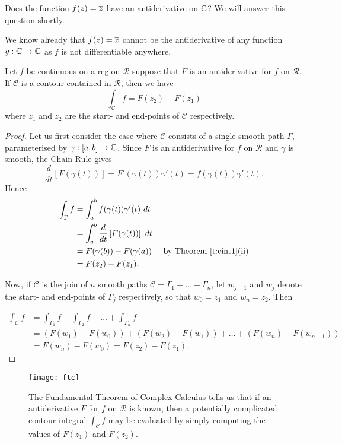 \begin{example}
Does the function $f(z) = \overline{z}$ have an antiderivative on $\mathbb{C}$?  We will answer this question shortly.
\end{example}
We know already that $f(z)=\overline{z}$ cannot be the antiderivative of any function $g:\mathbb{C} \to \mathbb{C}$ as $f$ is not differentiable anywhere.
\begin{theorem}
\label{t:ftc}
Let $f$ be continuous on a region $\mathcal{R}$ suppose that $F$ is an antiderivative for $f$ on $\mathcal{R}$.  If $\mathcal{C}$ is a contour contained in $\mathcal{R}$, then we have
\[
\int_{\mathcal{C}} f = F( z_2)-F(z_1)
\]
where $z_1$ and $z_2$ are the start- and end-points of $\mathcal{C}$ respectively.
\end{theorem}
\begin{proof}

Let us first consider the case where $\mathcal{C}$ consists of a single smooth path $\Gamma$, parameterised by $\gamma:[a,b] \to \mathbb{C}$.  Since $F$ is an antiderivative for $f$ on $\mathcal{R}$ and $\gamma$ is smooth, the Chain Rule gives
\[
\frac{d}{dt} \left[ F( \gamma(t)) \right] = F'(\gamma(t))\gamma'(t) = f(\gamma(t))\gamma ' (t).
\]
Hence
\begin{align*}
\int_{\Gamma} f & = \int_a^b f(\gamma(t)) \gamma' (t)\ dt & \\
& = \int_a^b \frac{d}{dt} \left[ F( \gamma (t) ) \right]\ dt & \\
& = F ( \gamma (b) ) - F ( \gamma (a) ) & \text{ by Theorem~\ref{t:cint1}(ii)} \\
& = F(z_2)-F(z_1).
\end{align*}



Now, if $\mathcal{C}$ is the join of $n$ smooth paths $\mathcal{C} = \Gamma_1+\ldots + \Gamma_n$, let $w_{j-1}$ and $w_j$ denote the start- and end-points of $\Gamma_j$ respectively, so that $w_0=z_1$ and $w_n=z_2$.  Then

\begin{align*}
\int_{\mathcal{C}} f & = \int_{\Gamma_1} f + \int_{\Gamma_2} f + \ldots + \int_{\Gamma_n} f \\
& = \left( F(w_1)-F(w_0) \right) + \left( F(w_2)-F(w_1) \right) + \ldots + \left( F(w_n)-F(w_{n-1}) \right) \\
& = F(w_n)-F(w_0) = F(z_2)-F(z_1).
\end{align*}


\end{proof}
\begin{figure}[h]
\centering
\texttt{[image: ftc]}
\caption{The Fundamental Theorem of Complex Calculus tells us that if an antiderivative $F$ for $f$ on $\mathcal{R}$ is known, then a potentially complicated contour integral $\int_{\mathcal{C}} f$ may be evaluated by simply computing the values of $F(z_1)$ and $F(z_2)$.}
\end{figure}

